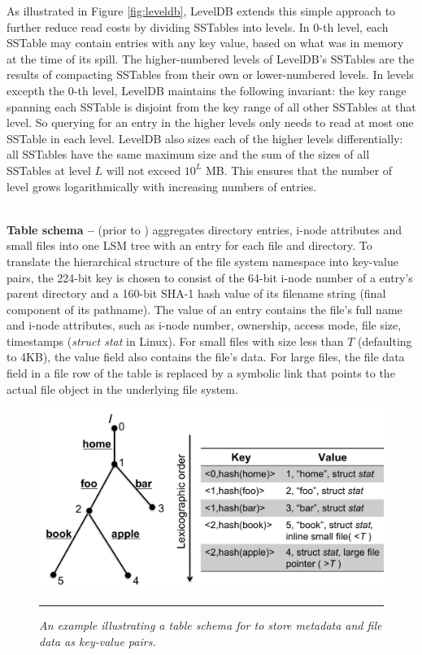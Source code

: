 As illustrated in Figure \ref{fig:leveldb},
LevelDB extends this simple approach to further
reduce read costs by dividing SSTables into levels.
In 0-th level, each SSTable may contain entries with any key value,
based on what was in memory at the time of its spill.
The higher-numbered levels of LevelDB's SSTables are
the results of compacting SSTables from their own or lower-numbered levels.
In levels excepth the 0-th level, LevelDB maintains the following invariant:
the key range spanning each SSTable is disjoint from
the key range of all other SSTables at that level.
So querying for an entry in the higher levels
only needs to read at most one SSTable in each level.
LevelDB also sizes each of the higher levels differentially:
all SSTables have the same maximum size and
the sum of the sizes of all SSTables at level $L$ will not exceed $10^L$ MB.
This ensures that the number of level grows
logarithmically with increasing numbers of entries.

~\\
\textbf{Table schema -- }
\tfs (prior to \sys) aggregates directory entries,
i-node attributes and small files into one LSM tree
with an entry for each file and directory.
To translate the hierarchical structure of the file system namespace
into key-value pairs, the 224-bit key is chosen to consist of
the 64-bit i-node number of a entry's parent directory
and a 160-bit SHA-1 hash value of its filename string
(final component of its pathname).
The value of an entry contains the file's full name and i-node attributes,
such as i-node number, ownership, access mode, file size, timestamps (\textit{struct stat} in Linux).
For small files with size less than $T$ (defaulting to 4KB),
the value field also contains the file's data.
For large files, the file data field in a file row of the table
is replaced by a symbolic link that points to
the actual file object in the underlying file system.

\begin{figure}[t]
\centering
\includegraphics[scale=0.4]{figs/schema}
\vspace{10pt}
\caption{\textit{\footnotesize
An example illustrating a table schema for \tfs
to store metadata and file data as key-value pairs.}}
\hrule
\label{fig:schema}
\end{figure}

